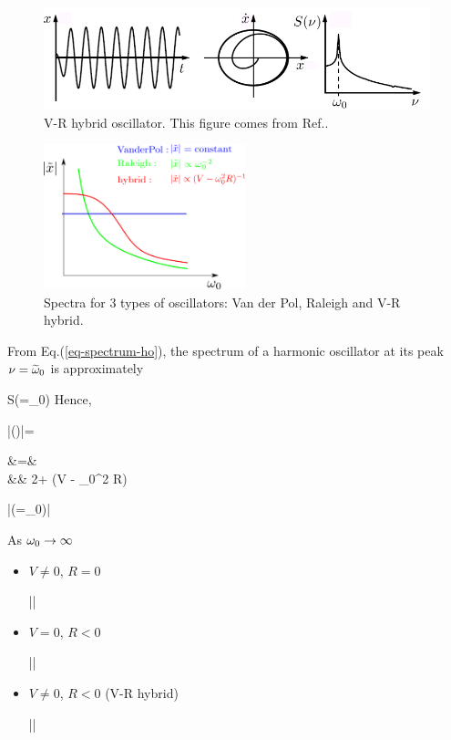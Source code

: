 \begin{figure}[h!]
\centering
\includegraphics[width=5in]
{dynamical-sys/hybrid-term.png}
\caption{V-R hybrid oscillator. This
 figure  comes from Ref.\cite{dynamical-fuchs}.}
\label{fig-hybrid-term}
\end{figure}


\begin{figure}[h!]
\centering
\includegraphics[width=2.3in]
{dynamical-sys/3-oscillator-spectra.png}
\caption{Spectra for 3 types of oscillators: Van der Pol, 
Raleigh and V-R hybrid.}
\label{fig-3-oscillator-spectra}
\end{figure}

From Eq.(\ref{eq-spectrum-ho}), the
spectrum of a harmonic oscillator at its peak 
$\nu={\widetilde{\omega}}_0$ is approximately

\beq
S(\nu=\TIL{\omega}_0)\approx {}
\eeq
Hence, 

\beq
|(\nu)|=
\approx {}
\eeq

\beqa
\av{2\TIL{\gamma}} &=&
\\
&\approx& 
2\gamma + (V  - \omega_0^2 R)
\eeqa

\beq
|(\nu=\omega_0)|\approx
{}
\eeq

As $\omega_0\rightarrow
\infty$
 
\begin{itemize}
\item $V\neq 0$, $R=0$

\beq
||\propto {}
\eeq

\item $V= 0$, $R< 0$

\beq
||\propto {}
\eeq

\item $V\neq 0$, $R< 0$ (V-R hybrid)

\beq
||\propto {}
\eeq



\end{itemize}


